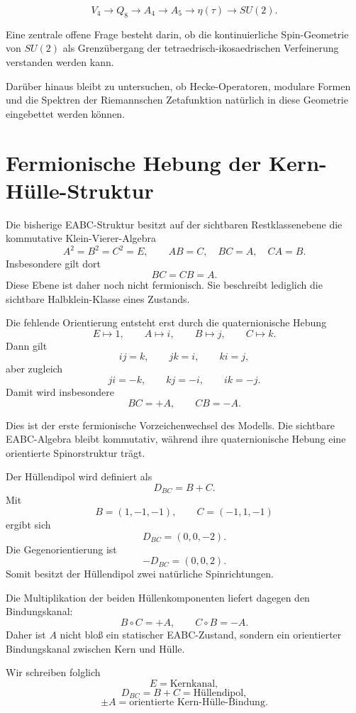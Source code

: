 \documentclass[11pt,a4paper]{article}
\begin{document}
	\[
	V_4
	\rightarrow
	Q_8
	\rightarrow
	A_4
	\rightarrow
	A_5
	\rightarrow
	\eta(\tau)
	\rightarrow
	SU(2).
	\]
	
	Eine zentrale offene Frage besteht darin,
	ob die kontinuierliche Spin-Geometrie von $SU(2)$
	als Grenzübergang der tetraedrisch-ikosaedrischen
	Verfeinerung verstanden werden kann.
	
	Darüber hinaus bleibt zu untersuchen,
	ob Hecke-Operatoren, modulare Formen
	und die Spektren der Riemannschen Zetafunktion
	natürlich in diese Geometrie eingebettet werden können.
	
	
	
	\section{Fermionische Hebung der Kern-Hülle-Struktur}
	
	Die bisherige EABC-Struktur besitzt auf der sichtbaren Restklassenebene die
	kommutative Klein-Vierer-Algebra
	\[
	A^2=B^2=C^2=E,
	\qquad
	AB=C,\quad BC=A,\quad CA=B.
	\]
	Insbesondere gilt dort
	\[
	BC=CB=A.
	\]
	Diese Ebene ist daher noch nicht fermionisch. Sie beschreibt lediglich die
	sichtbare Halbklein-Klasse eines Zustands.
	
	Die fehlende Orientierung entsteht erst durch die quaternionische Hebung
	\[
	E\mapsto 1,\qquad A\mapsto i,\qquad B\mapsto j,\qquad C\mapsto k.
	\]
	Dann gilt
	\[
	ij=k,\qquad jk=i,\qquad ki=j,
	\]
	aber zugleich
	\[
	ji=-k,\qquad kj=-i,\qquad ik=-j.
	\]
	Damit wird insbesondere
	\[
	BC=+A,
	\qquad
	CB=-A.
	\]
	
	Dies ist der erste fermionische Vorzeichenwechsel des Modells. Die sichtbare
	EABC-Algebra bleibt kommutativ, während ihre quaternionische Hebung eine
	orientierte Spinorstruktur trägt.
	
	Der Hüllendipol wird definiert als
	\[
	D_{BC}=B+C.
	\]
	Mit
	\[
	B=(1,-1,-1),
	\qquad
	C=(-1,1,-1)
	\]
	ergibt sich
	\[
	D_{BC}=(0,0,-2).
	\]
	Die Gegenorientierung ist
	\[
	-D_{BC}=(0,0,2).
	\]
	Somit besitzt der Hüllendipol zwei natürliche Spinrichtungen.
	
	Die Multiplikation der beiden Hüllenkomponenten liefert dagegen den
	Bindungskanal:
	\[
	B\circ C=+A,
	\qquad
	C\circ B=-A.
	\]
	Daher ist \(A\) nicht bloß ein statischer EABC-Zustand, sondern ein
	orientierter Bindungskanal zwischen Kern und Hülle.
	
	Wir schreiben folglich
	\[
	E=\text{Kernkanal},
	\]
	\[
	D_{BC}=B+C=\text{Hüllendipol},
	\]
	\[
	\pm A=\text{orientierte Kern-Hülle-Bindung}.
	\]
	
\end{document}

